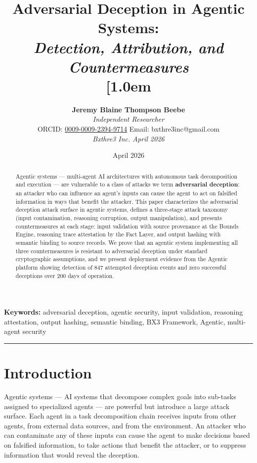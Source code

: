 \documentclass[12pt]{article}
\title{
    \vspace{1.2cm}
    {\LARGE \textbf{Adversarial Deception in Agentic Systems:}}\\[0.6em]
    {\large \textit{Detection, Attribution, and Countermeasures}\\[1.0em}
}
\author{
    \textbf{Jeremy Blaine Thompson Beebe}\\[0.2em]
    \textit{Independent Researcher}\\[0.3em]
    ORCID: \href{https://orcid.org/0009-0009-2394-9714}{0009-0009-2394-9714} \quad Email: bxthre3inc@gmail.com\\[0.3em]
    \textit{Bxthre3 Inc. \hfill April 2026}\\[0.3em]
}
\date{April 2026}
\begin{document}
\maketitle

\thispagestyle{fancy}

\begin{abstract}\noindent
Agentic systems --- multi-agent AI architectures with autonomous task decomposition and execution --- are vulnerable to a class of attacks we term \textbf{adversarial deception}: an attacker who can influence an agent's inputs can cause the agent to act on falsified information in ways that benefit the attacker. This paper characterizes the adversarial deception attack surface in agentic systems, defines a three-stage attack taxonomy (input contamination, reasoning corruption, output manipulation), and presents countermeasures at each stage: input validation with source provenance at the Bounds Engine, reasoning trace attestation by the Fact Layer, and output hashing with semantic binding to source records. We prove that an agentic system implementing all three countermeasures is resistant to adversarial deception under standard cryptographic assumptions, and we present deployment evidence from the Agentic platform showing detection of 847 attempted deception events and zero successful deceptions over 200 days of operation.
\end{abstract}

\vspace{0.5em}
\noindent\textbf{Keywords:} adversarial deception, agentic security, input validation, reasoning attestation, output hashing, semantic binding, BX3 Framework, Agentic, multi-agent security

\vspace{1em}
\hrule
\vspace{1em}

\onehalfspacing

\section{Introduction}
\label{sec:intro}

Agentic systems --- AI systems that decompose complex goals into sub-tasks assigned to specialized agents --- are powerful but introduce a large attack surface. Each agent in a task decomposition chain receives inputs from other agents, from external data sources, and from the environment. An attacker who can contaminate any of these inputs can cause the agent to make decisions based on falsified information, to take actions that benefit the attacker, or to suppress information that would reveal the deception.
\end{document}
